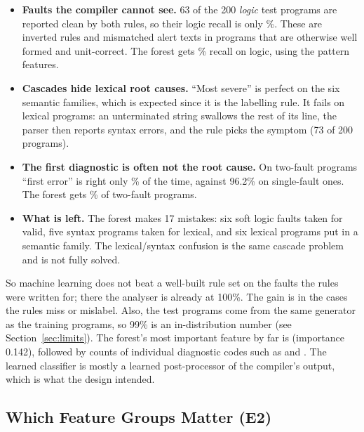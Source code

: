 \begin{itemize}
    \item \textbf{Faults the compiler cannot see.} 63 of the 200 \emph{logic} test programs are reported clean by both
    rules, so their logic recall is only \RuleLogicRecall\%. These are inverted rules and mismatched alert texts in
    programs that are otherwise well formed and unit-correct. The forest gets \RFLogicRecall\% recall on logic, using the
    pattern features.
    \item \textbf{Cascades hide lexical root causes.} ``Most severe'' is perfect on the six semantic families, which is
    expected since it is the labelling rule. It fails on lexical programs: an unterminated string swallows the rest of its
    line, the parser then reports syntax errors, and the rule picks the symptom (73 of 200 programs).
    \item \textbf{The first diagnostic is often not the root cause.} On two-fault programs ``first error'' is right only
    \RuleFirstDouble\% of the time, against 96.2\% on single-fault ones. The forest gets \RFDouble\% of two-fault programs.
    \item \textbf{What is left.} The forest makes 17 mistakes: six soft logic faults taken for valid, five syntax
    programs taken for lexical, and six lexical programs put in a semantic family. The lexical/syntax confusion is the
    same cascade problem and is not fully solved.
\end{itemize}

So machine learning does not beat a well-built rule set on the faults the rules were written for; there the analyser
is already at 100\%. The gain is in the cases the rules miss or mislabel. Also, the test programs come from the same
generator as the training programs, so 99\% is an in-distribution number (see Section~\ref{sec:limits}). The forest's most important
feature by far is  (importance 0.142), followed by counts of individual diagnostic codes such as
 and . The learned classifier is mostly a learned post-processor of the compiler's output,
which is what the design intended.

\subsection{Which Feature Groups Matter (E2)}

\begin{table}[!htbp]
\centering
\caption{Random-forest test macro-F1 by feature view and training programs per class (mean of five draws).}
\label{tab:learning}
\small

\end{table}

